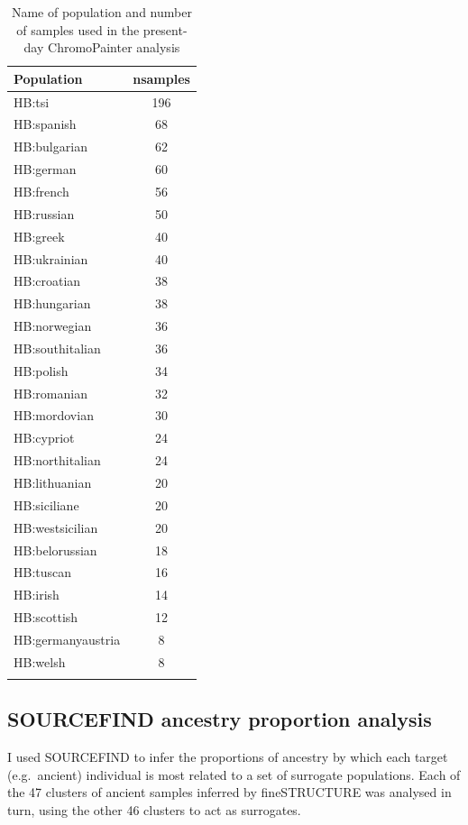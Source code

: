 \begin{table}
\small
\begin{tabular}{l|c}
\hline
Population & nsamples\\
\hline
HB:tsi & 196\\
\hline
HB:spanish & 68\\
\hline
HB:bulgarian & 62\\
\hline
HB:german & 60\\
\hline
HB:french & 56\\
\hline
HB:russian & 50\\
\hline
HB:greek & 40\\
\hline
HB:ukrainian & 40\\
\hline
HB:croatian & 38\\
\hline
HB:hungarian & 38\\
\hline
HB:norwegian & 36\\
\hline
HB:southitalian & 36\\
\hline
HB:polish & 34\\
\hline
HB:romanian & 32\\
\hline
HB:mordovian & 30\\
\hline
HB:cypriot & 24\\
\hline
HB:northitalian & 24\\
\hline
HB:lithuanian & 20\\
\hline
HB:siciliane & 20\\
\hline
HB:westsicilian & 20\\
\hline
HB:belorussian & 18\\
\hline
HB:tuscan & 16\\
\hline
HB:irish & 14\\
\hline
HB:scottish & 12\\
\hline
HB:germanyaustria & 8\\
\hline
HB:welsh & 8\\
\hline
\label{table:present-day_inds_painting}
\end{tabular}
\caption{Name of population and number of samples used in the present-day ChromoPainter analysis}
\end{table}

\subsection{SOURCEFIND ancestry proportion analysis}

I used SOURCEFIND \cite{Chacon-Duque2018} to infer the proportions of ancestry by which each target (e.g.\ ancient) individual is most related to a set of surrogate populations. Each of the 47 clusters of ancient samples inferred by fineSTRUCTURE was analysed in turn, using the other 46 clusters to act as surrogates.    

